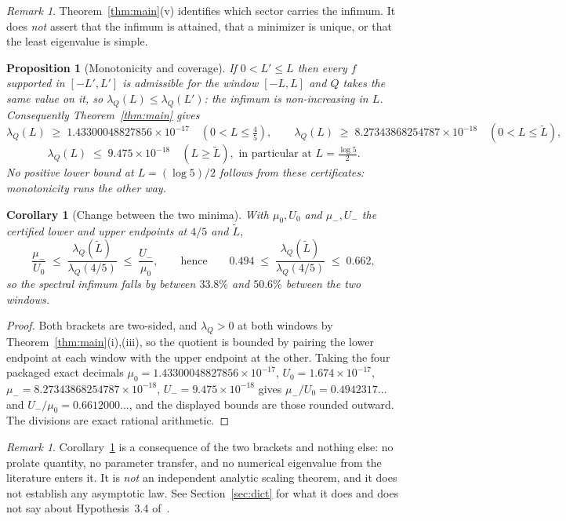 \documentclass[11pt,a4paper]{article}
\newtheorem{proposition}[theorem]{Proposition}
\newtheorem{corollary}[theorem]{Corollary}
\theoremstyle{definition}
\theoremstyle{remark}
\newtheorem{remark}[theorem]{Remark}
\newcommand{\lQ}{\lambda_{Q}}
\begin{document}
\begin{remark}
Theorem~\ref{thm:main}(v) identifies which sector carries the infimum. It does
\emph{not} assert that the infimum is attained, that a minimizer is unique, or
that the least eigenvalue is simple.
\end{remark}

\begin{proposition}[Monotonicity and coverage]
\label{prop:mono}
If $0 < L' \le L$ then every $f$ supported in $[-L',L']$ is admissible for the
window $[-L,L]$ and $Q$ takes the same value on it, so
$\lQ(L) \le \lQ(L')$: the infimum is non-increasing in $L$. Consequently
Theorem~\ref{thm:main} gives
\[
   \lQ(L) \;\ge\; 1.43300048827856\times10^{-17}
   \quad (0 < L \le \tfrac45) , \qquad
   \lQ(L) \;\ge\; 8.27343868254787\times10^{-18}
   \quad (0 < L \le \widetilde L) ,
\]
\[
   \lQ(L) \;\le\; 9.475\times10^{-18} \quad (L \ge \widetilde L) ,
   \text{ in particular at } L = \tfrac{\log 5}{2} .
\]
No positive lower bound at $L = (\log 5)/2$ follows from these certificates:
monotonicity runs the other way.
\end{proposition}

\begin{corollary}[Change between the two minima]
\label{cor:ratio}
With $\mu_0, U_0$ and $\mu_-, U_-$ the certified lower and upper endpoints at
$4/5$ and $\widetilde L$,
\[
   \frac{\mu_-}{U_0} \;\le\; \frac{\lQ(\widetilde L)}{\lQ(4/5)}
   \;\le\; \frac{U_-}{\mu_0} ,
   \qquad\text{hence}\qquad
   0.494 \;\le\; \frac{\lQ(\widetilde L)}{\lQ(4/5)} \;\le\; 0.662 ,
\]
so the spectral infimum falls by between $33.8\%$ and $50.6\%$ between the two
windows.
\end{corollary}

\begin{proof}
Both brackets are two-sided, and $\lQ > 0$ at both windows by
Theorem~\ref{thm:main}(i),(iii), so the quotient is bounded by pairing the lower
endpoint at each window with the upper endpoint at the other. Taking the four
packaged exact decimals $\mu_0 = 1.43300048827856\times10^{-17}$,
$U_0 = 1.674\times10^{-17}$, $\mu_- = 8.27343868254787\times10^{-18}$,
$U_- = 9.475\times10^{-18}$ gives
$\mu_-/U_0 = 0.4942317\ldots$ and $U_-/\mu_0 = 0.6612000\ldots$, and the
displayed bounds are those rounded outward. The divisions are exact rational
arithmetic.
\end{proof}

\begin{remark}
Corollary~\ref{cor:ratio} is a consequence of the two brackets and nothing else:
no prolate quantity, no parameter transfer, and no numerical eigenvalue from the
literature enters it. It is \emph{not} an independent analytic scaling theorem,
and it does not establish any asymptotic law. See
Section~\ref{sec:dict} for what it does and does not say about
Hypothesis~3.4 of~\cite{ACLG}.
\end{remark}
\end{document}
